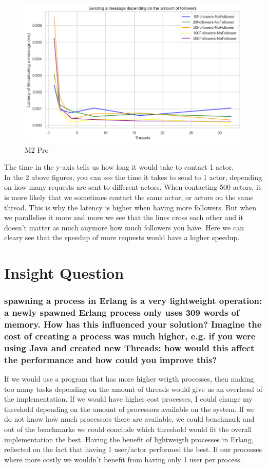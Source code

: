 \documentclass[a4paper]{article}
\begin{document}
\begin{figure}[H]
	\centering
	\includegraphics[width = \linewidth]{Images/SendingMessageLatency-Mean.png}
	\caption{M2 Pro}
\end{figure}
The time in the y-axis tells us how long it would take to contact 1 actor. \\


In the 2 above figures, you can see the time it takes to send to 1 actor, depending on how many requests are sent to different actors. When contacting 500 actors, it is more likely that we sometimes contact the same actor, or actors on the same thread. This is why the latency is higher when having more followers. But when we parallelise it more and more we see that the lines cross each other and it doesn't matter as much anymore how much followers you have. Here we can cleary see that the speedup of more requests would have a higher speedup.  


\section{Insight Question}

\subsubsection{spawning a process in Erlang is a very lightweight operation: a newly spawned Erlang process only uses 309 words of memory. How has this influenced your solution? Imagine the cost of
creating a process was much higher, e.g. if you were using Java and created new Threads: how
would this affect the performance and how could you improve this?
}

If we would use a program that has more higher weigth processes, then making too many tasks depending on the amount of threads would give us an overhead of the implementation. If we would have higher cost processes, I could change my threshold depending on the amount of processors available on the system. If we do not know how much processors there are available, we could benchmark and out of the benchmarks we could conclude which threshold would fit the overall implementation the best. Having the benefit of lightweigth processes in Erlang, reflected on the fact that having 1 user/actor performed the best. If our processes where more costly we wouldn't benefit from having only 1 user per process. 
\end{document}
